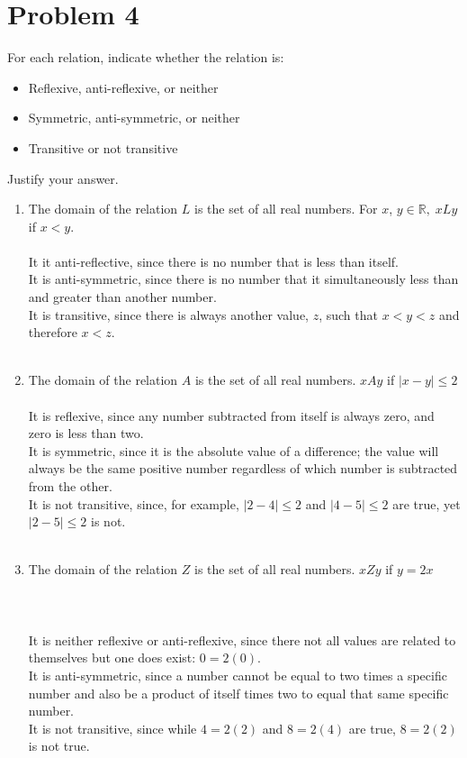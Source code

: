 \documentclass{amsart}
\theoremstyle{definition}
\theoremstyle{Exercise}
\theoremstyle{remark}
\theoremstyle{rule}
\numberwithin{equation}{section}
\newcommand{\Real}{\mathbb R}
\begin{document}
\section*{Problem 4}

For each relation, indicate whether the relation is:
\begin{itemize}
  \item Reflexive, anti-reflexive, or neither
  \item Symmetric, anti-symmetric, or neither
  \item Transitive or not transitive
\end{itemize}
Justify your answer.\\
\begin{enumerate}[label=(\alph*)]
\item The domain of the relation $L$ is the set of all real numbers. For $x$, $y \in \Real, \; xLy$ if $x < y$.\\\\
It it anti-reflective, since there is no number that is less than itself.\\
It is anti-symmetric, since there is no number that it simultaneously less than and greater than another number.\\
It is transitive, since there is always another value, $z$, such that $x < y < z$ and therefore $x < z$.
\\\\

\item The domain of the relation $A$ is the set of all real numbers. $xAy$ if $|x-y| \leq 2$\\\\
It is reflexive, since any number subtracted from itself is always zero, and zero is less than two.\\
It is symmetric, since it is the absolute value of a difference; the value will always be the same positive number regardless of which number is subtracted from the other.\\
It is not transitive, since, for example, $|2 - 4| \leq 2$ and $|4 - 5| \leq 2$ are true, yet $|2 - 5| \leq 2$ is not.
\\\\
\item The domain of the relation $Z$ is the set of all real numbers. $xZy$ if $y=2x$\\\\\\\\
It is neither reflexive or anti-reflexive, since there not all values are related to themselves but one does exist: $0 = 2(0)$.\\
It is anti-symmetric, since a number cannot be equal to two times a specific number and also be a product of itself times two to equal that same specific number.\\
It is not transitive, since while $4 = 2(2)$ and $8 = 2(4)$ are true, $8 = 2(2)$ is not true.
\\\\
\end{enumerate}
\newpage
\end{document}
